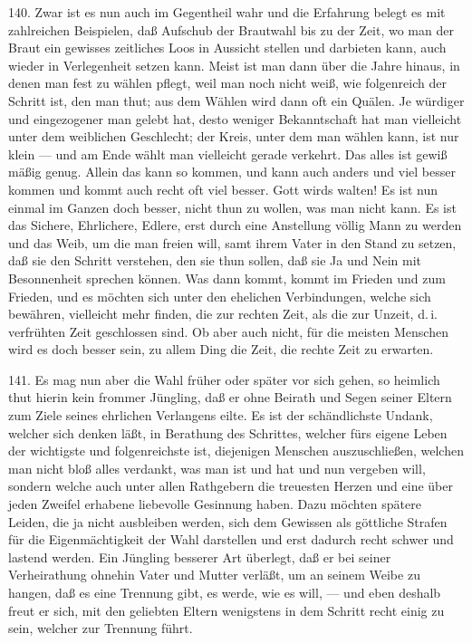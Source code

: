 140. Zwar ist es nun auch im Gegentheil wahr und die Erfahrung belegt es mit zahlreichen Beispielen, daß Aufschub der Brautwahl bis zu der Zeit, wo man der Braut ein gewisses zeitliches Loos in Aussicht stellen und darbieten kann, auch wieder in Verlegenheit setzen kann. Meist ist man dann über die Jahre hinaus, in denen man fest zu wählen pflegt, weil man noch nicht weiß, wie folgenreich der Schritt ist, den man thut; aus dem Wählen wird dann oft ein Quälen. Je würdiger und eingezogener man gelebt hat, desto weniger Bekanntschaft hat man vielleicht unter dem weiblichen Geschlecht; der Kreis, unter dem man wählen kann, ist nur klein — und am Ende wählt man vielleicht gerade verkehrt. Das alles ist gewiß
mäßig genug. Allein das kann so kommen, und kann auch anders und viel besser kommen und kommt auch recht oft viel besser. Gott wirds walten! Es ist nun einmal im Ganzen doch besser, nicht thun zu wollen, was man nicht kann. Es ist das Sichere, Ehrlichere, Edlere, erst durch eine Anstellung völlig Mann zu werden und das Weib, um die man freien will, samt ihrem Vater in den Stand zu setzen, daß sie den Schritt verstehen, den sie thun sollen, daß sie Ja und Nein mit Besonnenheit sprechen können. Was dann kommt, kommt im Frieden und zum Frieden, und es möchten sich unter den ehelichen Verbindungen, welche sich bewähren, vielleicht mehr finden, die zur rechten Zeit, als die zur Unzeit, d.\,i. verfrühten Zeit geschlossen sind. Ob aber auch nicht, für die meisten Menschen wird es doch besser sein, zu allem Ding die Zeit, die rechte Zeit zu erwarten.

141. Es mag nun aber die Wahl früher oder später vor sich gehen, so heimlich thut hierin kein frommer Jüngling, daß er ohne Beirath und Segen seiner Eltern zum Ziele seines ehrlichen Verlangens eilte. Es ist der schändlichste Undank, welcher sich denken läßt, in Berathung des Schrittes, welcher fürs eigene Leben der wichtigste und folgenreichste ist, diejenigen Menschen auszuschließen, welchen man nicht bloß alles verdankt, was man ist und hat und nun vergeben will, sondern welche auch unter allen Rathgebern die treuesten Herzen und eine über jeden Zweifel erhabene liebevolle Gesinnung haben. Dazu möchten spätere Leiden, die ja nicht ausbleiben werden, sich dem Gewissen als göttliche Strafen für die Eigenmächtigkeit
der Wahl darstellen und erst dadurch recht schwer und lastend werden. Ein Jüngling besserer Art überlegt, daß er bei seiner Verheirathung ohnehin Vater und Mutter verläßt, um an seinem Weibe zu hangen, daß es eine Trennung gibt, es werde, wie es will, — und eben deshalb freut er sich, mit den geliebten Eltern wenigstens in dem Schritt recht einig zu sein, welcher zur Trennung führt.

